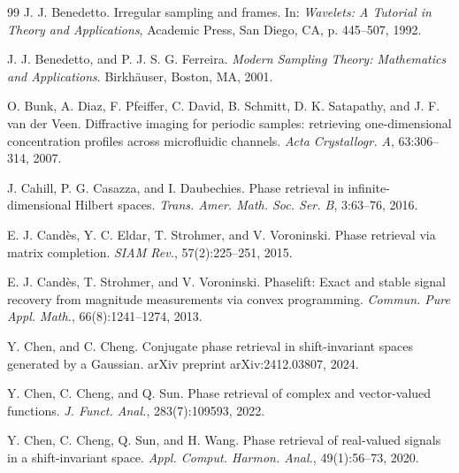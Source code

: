 \documentclass[12pt,oneside,reqno]{amsart}
\numberwithin{equation}{section}
\begin{document}
\begin{thebibliography}{99}
	J. J. Benedetto. Irregular sampling and frames. In:  \emph{Wavelets: A Tutorial in Theory and Applications}, Academic Press, San Diego, CA, p. 445--507, 1992.
	
	J. J. Benedetto, and P. J. S. G. Ferreira. \emph{Modern Sampling Theory: Mathematics and Applications}. Birkh{\"a}user, Boston, MA, 2001.
	

	
	O. Bunk, A. Diaz, F. Pfeiffer, C. David, B. Schmitt, D. K. Satapathy, and J. F. van der Veen. Diffractive imaging for periodic samples: retrieving one-dimensional concentration profiles across microfluidic channels. \emph{Acta Crystallogr. A}, 63:306--314, 2007.
	
	J. Cahill, P. G. Casazza, and I. Daubechies. Phase retrieval in infinite-dimensional Hilbert spaces. \emph{Trans. Amer. Math. Soc. Ser. B}, 3:63--76, 2016.
	
	
	E. J. Cand{\`e}s, Y. C. Eldar, T. Strohmer, and V. Voroninski. Phase retrieval via matrix completion. \emph{SIAM Rev.}, 57(2):225--251, 2015.
	
	E. J. Cand{\`e}s, T. Strohmer, and V. Voroninski. Phaselift: Exact and stable signal recovery from magnitude measurements via convex programming. \emph{Commun. Pure Appl. Math.}, 66(8):1241--1274, 2013.
	
	Y. Chen, and C. Cheng. Conjugate phase retrieval in shift-invariant spaces generated by a Gaussian. arXiv preprint arXiv:2412.03807, 2024.
	
	Y. Chen, C. Cheng, and Q. Sun. Phase retrieval of complex and vector-valued functions. \emph{J. Funct. Anal.}, 283(7):109593, 2022.
	
	Y. Chen, C. Cheng, Q. Sun, and H. Wang. Phase retrieval of real-valued signals in a shift-invariant space. \emph{Appl. Comput. Harmon. Anal.}, 49(1):56--73, 2020.
	
	

\end{thebibliography}
\end{document}
